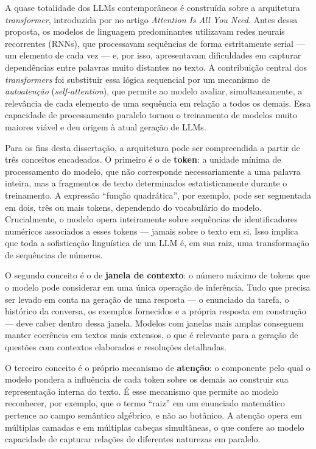 A quase totalidade dos LLMs contemporâneos é construída sobre a arquitetura \emph{transformer},
introduzida por \citet{vaswani2017attention} no artigo \emph{Attention Is All You Need}. Antes
dessa proposta, os modelos de linguagem predominantes utilizavam redes neurais recorrentes (RNNs),
que processavam sequências de forma estritamente serial --- um elemento de cada vez --- e, por
isso, apresentavam dificuldades em capturar dependências entre palavras muito distantes no texto. A
contribuição central dos \emph{transformers} foi substituir essa lógica sequencial por um mecanismo
de \emph{autoatenção} (\emph{self-attention}), que permite ao modelo avaliar, simultaneamente, a
relevância de cada elemento de uma sequência em relação a todos os demais. Essa capacidade de
processamento paralelo tornou o treinamento de modelos muito maiores viável e deu origem à atual
geração de LLMs.

Para os fins desta dissertação, a arquitetura pode ser compreendida a partir de três conceitos
encadeados. O primeiro é o de \textbf{token}: a unidade mínima de processamento do modelo, que não
corresponde necessariamente a uma palavra inteira, mas a fragmentos de texto determinados
estatisticamente durante o treinamento. A expressão ``função quadrática'', por exemplo, pode ser
segmentada em dois, três ou mais tokens, dependendo do vocabulário do modelo. Crucialmente, o
modelo opera inteiramente sobre sequências de identificadores numéricos associados a esses tokens
--- jamais sobre o texto em si. Isso implica que toda a sofisticação linguística de um LLM é, em
sua raiz, uma transformação de sequências de números.

O segundo conceito é o de \textbf{janela de contexto}: o número máximo de tokens que o modelo pode
considerar em uma única operação de inferência. Tudo que precisa ser levado em conta na geração de
uma resposta --- o enunciado da tarefa, o histórico da conversa, os exemplos fornecidos e a própria
resposta em construção --- deve caber dentro dessa janela. Modelos com janelas mais amplas
conseguem manter coerência em textos mais extensos, o que é relevante para a geração de questões com
contextos elaborados e resoluções detalhadas.

O terceiro conceito é o próprio mecanismo de \textbf{atenção}: o componente pelo qual o modelo
pondera a influência de cada token sobre os demais ao construir sua representação interna do texto.
É esse mecanismo que permite ao modelo reconhecer, por exemplo, que o termo ``raiz'' em um
enunciado matemático pertence ao campo semântico algébrico, e não ao botânico. A atenção opera em
múltiplas camadas e em múltiplas cabeças simultâneas, o que confere ao modelo capacidade de capturar
relações de diferentes naturezas em paralelo.

